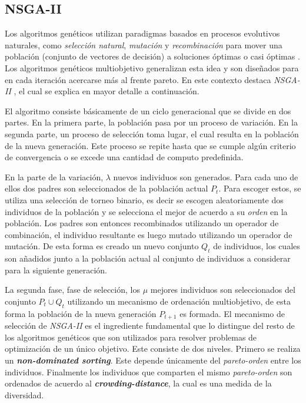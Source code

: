 \subsection{NSGA-II}

Los algoritmos genéticos utilizan paradigmas basados en procesos evolutivos naturales, como \textit{selección natural}, \textit{mutación} y \textit{recombinación} para mover una población (conjunto de vectores de decisión) a soluciones óptimas o casi óptimas \parencite{back1996evolutionary}.
Los algoritmos genéticos multiobjetivo generalizan esta idea y son diseñados para en cada iteración acercarse más al frente pareto.
En este contexto destaca \emph{NSGA-II} \parencite{deb2002nsgaii}, el cual se explica en mayor detalle a continuación.

El algoritmo consiste básicamente de un ciclo generacional que se divide en dos partes.
En la primera parte, la población pasa por un proceso de variación.
En la segunda parte, un proceso de selección toma lugar, el cual resulta en la población de la nueva generación.
Este proceso se repite hasta que se cumple algún criterio de convergencia o se excede una cantidad de computo predefinida.

En la parte de la variación, $\lambda$ nuevos individuos son generados.
Para cada uno de ellos dos padres son seleccionados de la población actual $P_t$.
Para escoger estos, se utiliza una selección de torneo binario, es decir se escogen aleatoriamente dos individuos de la población y se selecciona el mejor de acuerdo a su \emph{orden} en la población.
Los padres son entonces recombinados utilizando un operador de combinación, el individuo resultante es luego mutado utilizando un operador de mutación.
De esta forma es creado un nuevo conjunto $Q_t$ de individuos, los cuales son añadidos junto a la población actual al conjunto de individuos a considerar para la siguiente generación.

La segunda fase, fase de selección, los $\mu$ mejores individuos son seleccionados del conjunto $P_t \cup Q_t$ utilizando un mecanismo de ordenación multiobjetivo, de esta forma la población de la nueva generación $P_{t+1}$ es formada.
El mecanismo de selección de \emph{NSGA-II} es el ingrediente fundamental que lo distingue del resto de los algoritmos genéticos que son utilizados para resolver problemas de optimización de un único objetivo.
Este consiste de dos niveles.
Primero se realiza un \emph{\textbf{non-dominated sorting}}.
Este depende únicamente del \emph{pareto-orden} entre los individuos.
Finalmente los individuos que comparten el mismo \emph{pareto-orden} son ordenados de acuerdo al \emph{\textbf{crowding-distance}}, la cual es una medida de la diversidad.

